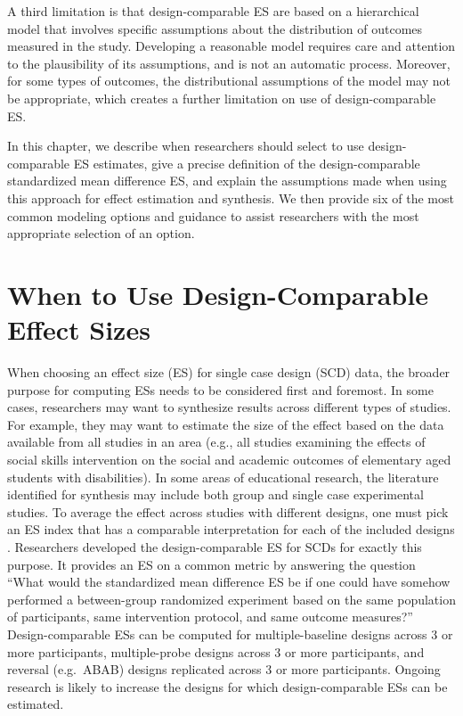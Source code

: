 \documentclass[
]{book}
\begin{document}
A third limitation is that design-comparable ES are based on a hierarchical model that involves specific assumptions about the distribution of outcomes measured in the study. Developing a reasonable model requires care and attention to the plausibility of its assumptions, and is not an automatic process. Moreover, for some types of outcomes, the distributional assumptions of the model may not be appropriate, which creates a further limitation on use of design-comparable ES.

In this chapter, we describe when researchers should select to use design-comparable ES estimates, give a precise definition of the design-comparable standardized mean difference ES, and explain the assumptions made when using this approach for effect estimation and synthesis. We then provide six of the most common modeling options and guidance to assist researchers with the most appropriate selection of an option.

\hypertarget{when-to-use-design-comparable-effect-sizes}{%
\section{When to Use Design-Comparable Effect Sizes}\label{when-to-use-design-comparable-effect-sizes}}

When choosing an effect size (ES) for single case design (SCD) data, the broader purpose for computing ESs needs to be considered first and foremost. In some cases, researchers may want to synthesize results across different types of studies. For example, they may want to estimate the size of the effect based on the data available from all studies in an area (e.g., all studies examining the effects of social skills intervention on the social and academic outcomes of elementary aged students with disabilities). In some areas of educational research, the literature identified for synthesis may include both group and single case experimental studies. To average the effect across studies with different designs, one must pick an ES index that has a comparable interpretation for each of the included designs \citep{Hedges2012ABk, Hedges2012MB, Pustejovsky2014design, Shadish2013d, Swaminathan2014effect}. Researchers developed the design-comparable ES for SCDs for exactly this purpose. It provides an ES on a common metric by answering the question ``What would the standardized mean difference ES be if one could have somehow performed a between-group randomized experiment based on the same population of participants, same intervention protocol, and same outcome measures?'' Design-comparable ESs can be computed for multiple-baseline designs across 3 or more participants, multiple-probe designs across 3 or more participants, and reversal (e.g.~ABAB) designs replicated across 3 or more participants. Ongoing research is likely to increase the designs for which design-comparable ESs can be estimated.
\end{document}
